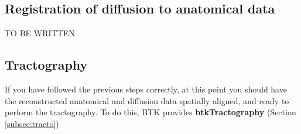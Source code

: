 \subsection{Registration of diffusion to anatomical data}
TO BE WRITTEN

\subsection{Tractography}
If you have followed the previous steps correctly, at this point you should
have the reconstructed anatomical and diffusion data spatially aligned, and
ready to perform the tractography. To do this, BTK provides
\textbf{btkTractography} (Section \ref{subsec:tracto})
